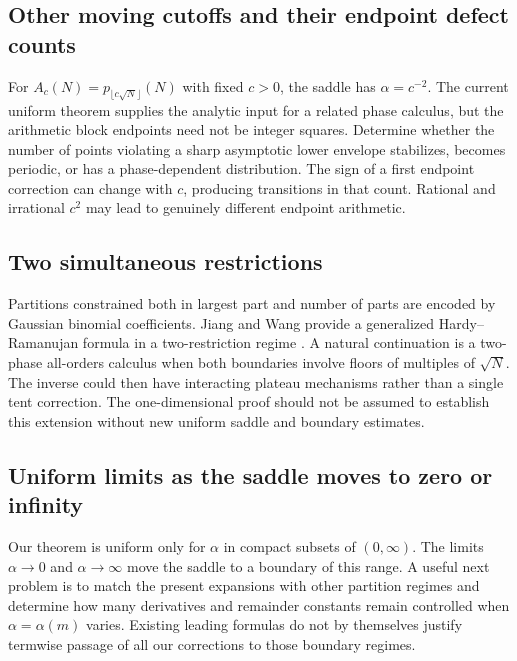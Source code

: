 \documentclass[11pt,a4paper]{article}
\numberwithin{equation}{section}
\theoremstyle{definition}
\theoremstyle{remark}
\begin{document}
\subsection{Other moving cutoffs and their endpoint defect counts}
For $A_c(N)=p_{\lfloor c\sqrt N\rfloor}(N)$ with fixed $c>0$, the saddle
has $\alpha=c^{-2}$. The current uniform theorem supplies the analytic
input for a related phase calculus, but the arithmetic block endpoints
need not be integer squares. Determine whether the number of points
violating a sharp asymptotic lower envelope stabilizes, becomes
periodic, or has a phase-dependent distribution. The sign of a first
endpoint correction can change with $c$, producing transitions in that
count. Rational and irrational $c^2$ may lead to genuinely different
endpoint arithmetic.

\subsection{Two simultaneous restrictions}
Partitions constrained both in largest part and number of parts are
encoded by Gaussian binomial coefficients. Jiang and Wang provide a
generalized Hardy--Ramanujan formula in a two-restriction regime
\cite{jiangwang}. A natural continuation is a two-phase all-orders
calculus when both boundaries involve floors of multiples of $\sqrt N$.
The inverse could then have interacting plateau mechanisms rather than
a single tent correction. The one-dimensional proof should not be
assumed to establish this extension without new uniform saddle and
boundary estimates.

\subsection{Uniform limits as the saddle moves to zero or infinity}
Our theorem is uniform only for $\alpha$ in compact subsets of
$(0,\infty)$. The limits $\alpha\to0$ and $\alpha\to\infty$ move the
saddle to a boundary of this range. A useful next problem is to match
the present expansions with other partition regimes and determine how
many derivatives and remainder constants remain controlled when
$\alpha=\alpha(m)$ varies. Existing leading formulas do not by themselves
justify termwise passage of all our corrections to those boundary
regimes.
\end{document}

